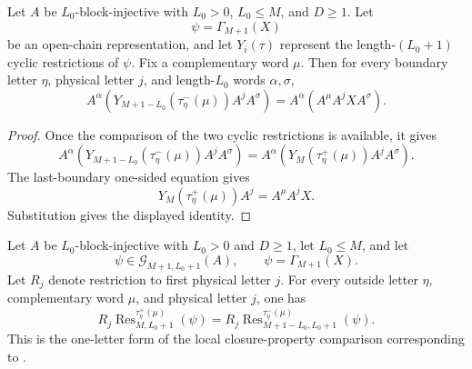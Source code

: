 \begin{theorem}
    \label{thm:closure_property_mirror_left_word_products_ground_space}
    \leanok
    Let $A$ be $L_0$-block-injective with $L_0>0$, $L_0\le M$, and
    $D\ge1$. Let
    \[
        \psi=\Gamma_{M+1}(X)
    \]
    be an open-chain representation, and let $Y_i(\tau)$ represent the
    length-$(L_0+1)$ cyclic restrictions of $\psi$. Fix a complementary word
    $\mu$. Then for every boundary letter $\eta$, physical letter $j$, and
    length-$L_0$ words $\alpha,\sigma$,
    \[
        A^\alpha
        \left(Y_{M+1-L_0}(\tau^-_\eta(\mu))A^jA^\sigma\right)
        =
        A^\alpha
        \left(A^\mu A^jXA^\sigma\right).
    \]
\end{theorem}

\begin{proof}
    \notready
    Once the comparison of the two cyclic restrictions is available, it gives
    \[
        A^\alpha
        \left(Y_{M+1-L_0}(\tau^-_\eta(\mu))A^jA^\sigma\right)
        =
        A^\alpha
        \left(Y_M(\tau^+_\eta(\mu))A^jA^\sigma\right).
    \]
    The last-boundary one-sided equation gives
    \[
        Y_M(\tau^+_\eta(\mu))A^j=A^\mu A^jX.
    \]
    Substitution gives the displayed identity.
\end{proof}

\begin{lemma}
    \label{lem:closure_property_fixed_boundary_letter_chain_ground_space}
    \leanok
    Let $A$ be $L_0$-block-injective with $L_0>0$ and $D\ge1$, let
    $L_0\le M$, and let
    \[
        \psi\in\mathcal G_{M+1,L_0+1}(A),
        \qquad
        \psi=\Gamma_{M+1}(X).
    \]
    Let $R_j$ denote restriction to first physical letter $j$.  For every
    outside letter $\eta$, complementary word $\mu$, and physical letter $j$,
    one has
    \[
        R_j\operatorname{Res}^{\tau^+_\eta(\mu)}_{M,L_0+1}(\psi)
        =
        R_j\operatorname{Res}^{\tau^-_\eta(\mu)}_{M+1-L_0,L_0+1}(\psi).
    \]
    This is the one-letter form of the local closure-property comparison
    corresponding to \cite[lines~2078--2079]{Cirac2021Matrix}.
\end{lemma}

